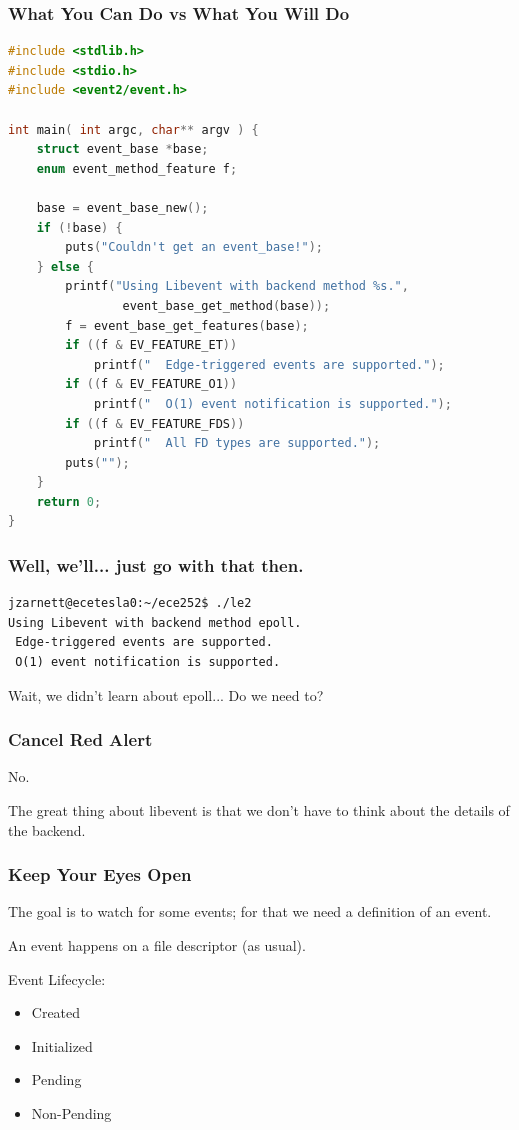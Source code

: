 \begin{frame}[fragile]
	\frametitle{What You Can Do vs What You Will Do}

	\begin{lstlisting}[language=C]
#include <stdlib.h>
#include <stdio.h>
#include <event2/event.h>

int main( int argc, char** argv ) { 
    struct event_base *base;
    enum event_method_feature f;

    base = event_base_new();
    if (!base) {
        puts("Couldn't get an event_base!");
    } else {
        printf("Using Libevent with backend method %s.",
                event_base_get_method(base));
        f = event_base_get_features(base);
        if ((f & EV_FEATURE_ET))
            printf("  Edge-triggered events are supported.");
        if ((f & EV_FEATURE_O1))
            printf("  O(1) event notification is supported.");
        if ((f & EV_FEATURE_FDS))
            printf("  All FD types are supported.");
        puts("");
    }   
    return 0;
}
\end{lstlisting}


\end{frame}

\begin{frame}[fragile]
	\frametitle{Well, we'll... just go with that then.}

	\begin{verbatim}
jzarnett@ecetesla0:~/ece252$ ./le2
Using Libevent with backend method epoll.  
 Edge-triggered events are supported.  
 O(1) event notification is supported.
\end{verbatim}

	Wait, we didn't learn about epoll... Do we need to?

\end{frame}


\begin{frame}
	\frametitle{Cancel Red Alert}

	No.

	The great thing about libevent is that we don't have to think about the details of the backend.


\end{frame}


\begin{frame}
	\frametitle{Keep Your Eyes Open}

	The goal is to watch for some events; for that we need a definition of an event.

	An event happens on a file descriptor (as usual).

	Event Lifecycle:\begin{itemize}
		\item Created
		\item Initialized
		\item Pending
		\item Non-Pending
	\end{itemize}

\end{frame}


